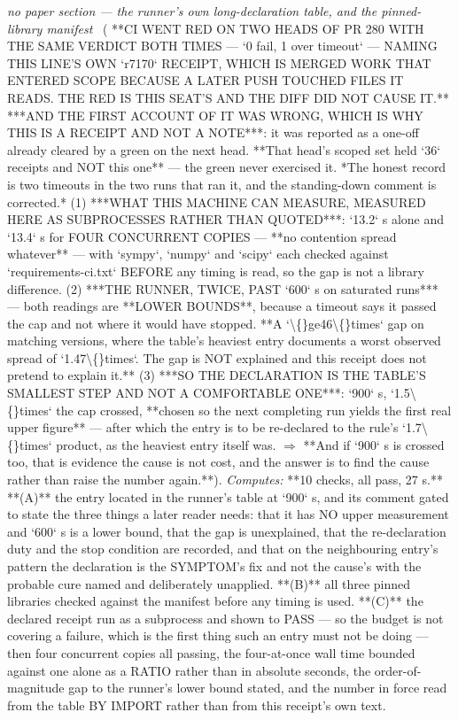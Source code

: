 \begin{description}
\textit{no paper section --- the runner's own long-declaration table, and the pinned-library manifest} \ ( **CI WENT RED ON TWO HEADS OF PR 280 WITH THE SAME VERDICT BOTH TIMES --- `0 fail, 1 over timeout` --- NAMING THIS LINE'S OWN `r7170` RECEIPT, WHICH IS MERGED WORK THAT ENTERED SCOPE BECAUSE A LATER PUSH TOUCHED FILES IT READS. THE RED IS THIS SEAT'S AND THE DIFF DID NOT CAUSE IT.**  ***AND THE FIRST ACCOUNT OF IT WAS WRONG, WHICH IS WHY THIS IS A RECEIPT AND NOT A NOTE***: it was reported as a one-off already cleared by a green on the next head. **That head's scoped set held `36` receipts and NOT this one** --- the green never exercised it. *The honest record is two timeouts in the two runs that ran it, and the standing-down comment is corrected.* (1) ***WHAT THIS MACHINE CAN MEASURE, MEASURED HERE AS SUBPROCESSES RATHER THAN QUOTED***: `13.2` s alone and `13.4` s for FOUR CONCURRENT COPIES --- **no contention spread whatever** --- with `sympy`, `numpy` and `scipy` each checked against `requirements-ci.txt` BEFORE any timing is read, so the gap is not a library difference. (2) ***THE RUNNER, TWICE, PAST `600` s on saturated runs*** --- both readings are **LOWER BOUNDS**, because a timeout says it passed the cap and not where it would have stopped. **A `\textbackslash\{\}ge46\textbackslash\{\}times` gap on matching versions, where the table's heaviest entry documents a worst observed spread of `1.47\textbackslash\{\}times`. The gap is NOT explained and this receipt does not pretend to explain it.** (3) ***SO THE DECLARATION IS THE TABLE'S SMALLEST STEP AND NOT A COMFORTABLE ONE***: `900` s, `1.5\textbackslash\{\}times` the cap crossed, **chosen so the next completing run yields the first real upper figure** --- after which the entry is to be re-declared to the rule's `1.7\textbackslash\{\}times` product, as the heaviest entry itself was. \ensuremath{\Rightarrow} **And if `900` s is crossed too, that is evidence the cause is not cost, and the answer is to find the cause rather than raise the number again.**). 
\emph{Computes:} **10 checks, all pass, 27 s.** **(A)** the entry located in the runner's table at `900` s, and its comment gated to state the three things a later reader needs: that it has NO upper measurement and `600` s is a lower bound, that the gap is unexplained, that the re-declaration duty and the stop condition are recorded, and that on the neighbouring entry's pattern the declaration is the SYMPTOM's fix and not the cause's with the probable cure named and deliberately unapplied. **(B)** all three pinned libraries checked against the manifest before any timing is used. **(C)** the declared receipt run as a subprocess and shown to PASS --- so the budget is not covering a failure, which is the first thing such an entry must not be doing --- then four concurrent copies all passing, the four-at-once wall time bounded against one alone as a RATIO rather than in absolute seconds, the order-of-magnitude gap to the runner's lower bound stated, and the number in force read from the table BY IMPORT rather than from this receipt's own text.

\end{description}
